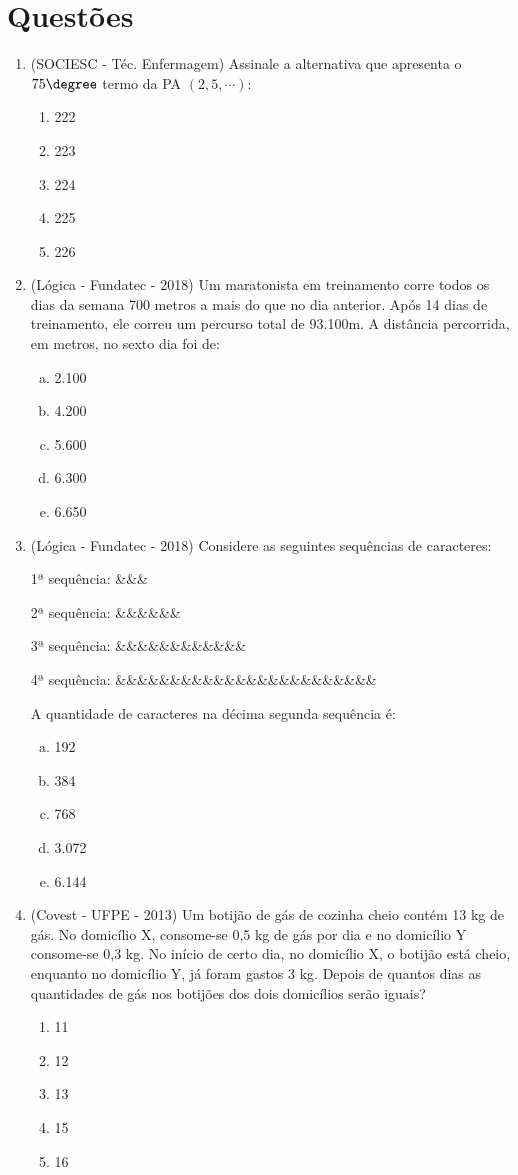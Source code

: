 
\section{Questões}
\begin{enumerate}
 \item (SOCIESC - Téc. Enfermagem) Assinale a alternativa que apresenta o $75\degree$ termo da PA $(2, 5, \cdots)$:
  \begin{enumerate}
  \item 222
  \item 223
  \item 224
  \item 225
  \item 226
 \end{enumerate}

 \item (Lógica - Fundatec - 2018) Um maratonista em treinamento corre todos os dias da semana 700 metros a mais do que no dia anterior. Após 14 dias de treinamento, ele correu um percurso total de 93.100m. A distância percorrida, em metros, no sexto dia foi de:

\begin{enumerate}[a)]
\item 2.100
\item 4.200
\item 5.600
\item 6.300
\item 6.650
\end{enumerate}


\item (Lógica - Fundatec - 2018) Considere as seguintes sequências de caracteres:

1ª sequência: \&\&\&

2ª sequência: \&\&\&\&\&\&

3ª sequência: \&\&\&\&\&\&\&\&\&\&\&\&

4ª sequência: \&\&\&\&\&\&\&\&\&\&\&\&\&\&\&\&\&\&\&\&\&\&\&\&

A quantidade de caracteres na décima segunda sequência é:

\begin{enumerate}[a)]
\item 192
\item 384
\item 768
\item 3.072
\item 6.144
\end{enumerate}


\item (Covest - UFPE - 2013) Um botijão de gás de cozinha cheio contém 13 kg de gás. No domicílio X, consome-se 0,5 kg de gás por dia e no domicílio Y consome-se 0,3 kg. No início de certo dia, no domicílio X, o botijão está cheio, enquanto no domicílio Y, já foram gastos 3 kg. Depois de quantos dias as quantidades de gás nos botijões dos dois domicílios serão iguais?
\begin{enumerate}
\item 11
\item 12
\item 13
\item 15
\item 16
\end{enumerate}


\end{enumerate}
